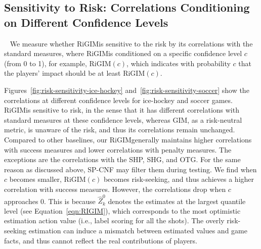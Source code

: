 \documentclass{article}
\newcommand{\agentIndex}{k}
\newcommand{\confidence}{c}
\newcommand{\sys}{RiGIM}
\newcommand{\system}{\sys\;}
\begin{document}
\subsection{Sensitivity to Risk: Correlations Conditioning on Different Confidence Levels}~\label{subsec:risk-sensitive-results}
We measure whether \system is sensitive to the risk by its correlations with the standard measures, where \system is conditioned on a specific confidence level $\confidence$ (from 0 to 1), for example, \sys$(c)$, which indicates with probability $\confidence$ that the players' impact should be at least \sys$(\confidence)$.

Figures~\ref{fig:risk-sensitivity-ice-hockey} and~\ref{fig:risk-sensitivity-soccer} show the correlations at different confidence levels for ice-hockey and soccer games. \system is sensitive to risk, in the sense that it has different correlations with standard measures at these confidence levels, whereas GIM, as a risk-neutral metric, is unaware of the risk, and thus its correlations remain unchanged. 
Compared to other baselines, our \system generally maintains higher correlations with success measures and lower correlations with penalty measures. The exceptions are the correlations with the SHP, SHG, and OTG. For the same reason as discussed above, SP-CNF may filter them during testing. 
We find when $\confidence$ becomes smaller, \sys$(\confidence)$ becomes risk-seeking, and thus achieves a higher correlation with success measures. However, the correlations drop when $\confidence$ approaches 0. This is because $\hat{Z}_{\agentIndex}^{0}$ denotes the estimates at the largest quantile level (see Equation~\ref{eqn:RIGIM}), which corresponds to the most optimistic estimation action value (i.e., label scoring for all the shots). The overly risk-seeking estimation can induce a mismatch between estimated values and game facts, and thus cannot reflect the real contributions of players.
\end{document}
